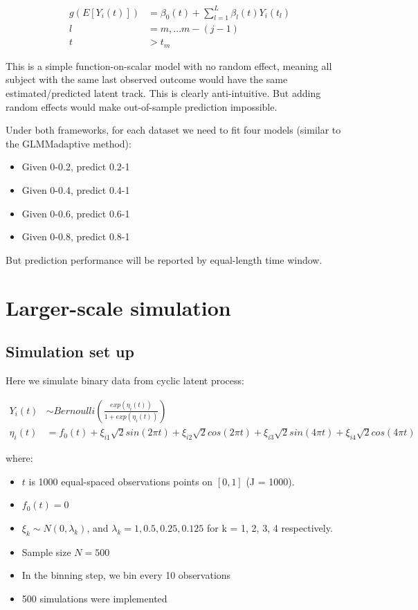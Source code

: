 \documentclass[
]{article}
\providecommand{\tightlist}{%
  \setlength{\itemsep}{0pt}\setlength{\parskip}{0pt}}
\begin{document}
\[\begin{aligned}
g(E[Y_i(t)]) &= \beta_0(t) +\sum_{l=1}^L \beta_l (t)Y_i(t_l)\\
l & = m,...m-(j-1)\\
t &> t_m 
\end{aligned}\]

This is a simple function-on-scalar model with no random effect, meaning
all subject with the same last observed outcome would have the same
estimated/predicted latent track. This is clearly anti-intuitive. But
adding random effects would make out-of-sample prediction impossible.

Under both frameworks, for each dataset we need to fit four models
(similar to the GLMMadaptive method):

\begin{itemize}
\tightlist
\item
  Given 0-0.2, predict 0.2-1
\item
  Given 0-0.4, predict 0.4-1
\item
  Given 0-0.6, predict 0.6-1
\item
  Given 0-0.8, predict 0.8-1
\end{itemize}

But prediction performance will be reported by equal-length time window.

\section{Larger-scale simulation}\label{larger-scale-simulation}

\subsection{Simulation set up}\label{simulation-set-up}

Here we simulate binary data from cyclic latent process:

\[\begin{aligned}
Y_i(t) & \sim Bernoulli(\frac{exp(\eta_i(t))}{1+exp(\eta_i(t))}) \\
\eta_i(t) &= f_0(t)+ \xi_{i1}\sqrt{2}sin(2\pi t)+\xi_{i2}\sqrt{2}cos(2\pi t)+\xi_{i3}\sqrt{2}sin(4\pi t)+\xi_{i4}\sqrt{2}cos(4\pi t)
\end{aligned}\]

where:

\begin{itemize}
\tightlist
\item
  \(t\) is 1000 equal-spaced observations points on \([0, 1]\) (J =
  1000).
\item
  \(f_0(t)=0\)
\item
  \(\xi_k \sim N(0, \lambda_k)\), and
  \(\lambda_k = 1, 0.5, 0.25, 0.125\) for k = 1, 2, 3, 4 respectively.
\item
  Sample size \(N = 500\)
\item
  In the binning step, we bin every 10 observations
\item
  500 simulations were implemented
\end{itemize}
\end{document}
